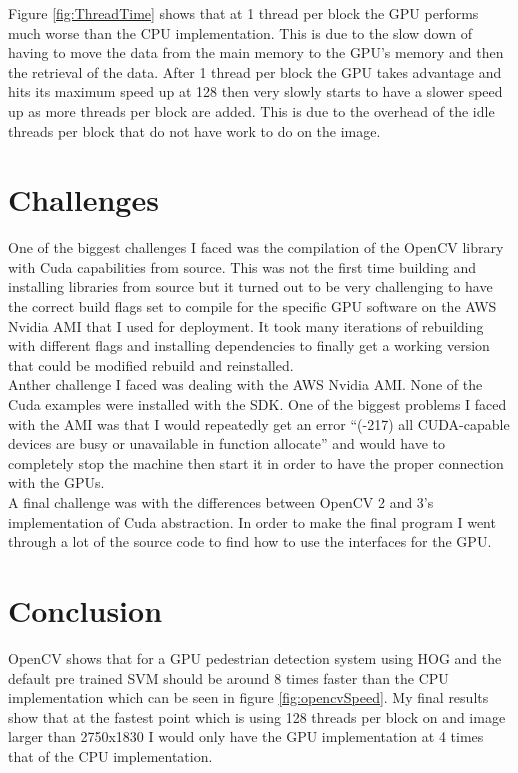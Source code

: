 \documentclass[journal]{IEEEtran}
\begin{document}
Figure \ref{fig:ThreadTime} shows that at 1 thread per block the GPU performs much worse than the CPU implementation. This is due to the slow down of having to move the data from the main memory to the GPU’s memory and then the retrieval of the data. After 1 thread per block the GPU takes advantage and hits its maximum speed up at 128 then very slowly starts to have a slower speed up as more threads per block are added. This is due to the overhead of the idle threads per block that do not have work to do on the image.

\section{Challenges}

    One of the biggest challenges I faced was the compilation of the OpenCV library with Cuda capabilities from source. This was not the first time building and installing libraries from source but it turned out to be very challenging to have the correct build flags set to compile for the specific GPU software on the AWS Nvidia AMI that I used for deployment. It took many iterations of rebuilding with different flags and installing dependencies to finally get a working version that could be modified rebuild and reinstalled. \\

    Anther challenge I faced was dealing with the AWS Nvidia AMI. None of the Cuda examples were installed with the SDK. One of the biggest problems I faced with the AMI was that I would repeatedly get an error “(-217) all CUDA-capable devices are busy or unavailable in function allocate” and would have to completely stop the machine then start it in order to have the proper connection with the GPUs. \\

    A final challenge was with the differences between OpenCV 2 and 3’s implementation of Cuda abstraction. In order to make the final program I went through a lot of the source code to find how to use the interfaces for the GPU. \\


\section{Conclusion}
OpenCV shows that for a GPU pedestrian detection system using HOG and the default pre trained SVM should be around 8 times faster than the CPU implementation which can be seen in figure \ref{fig:opencvSpeed}. My final results show that at the fastest point which is using 128 threads per block on and image larger than 2750x1830 I would only have the GPU implementation at 4 times that of the CPU implementation. \\
\end{document}
